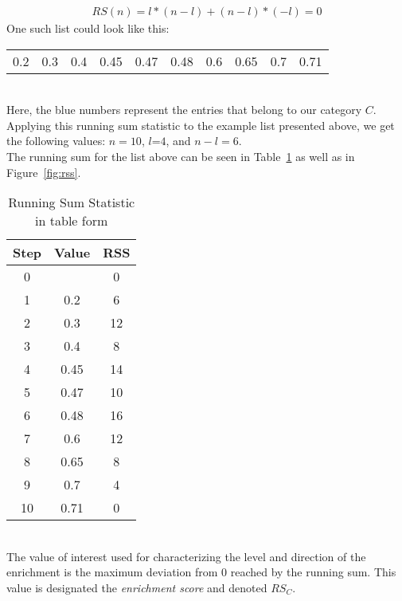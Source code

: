 \begin{align}
	RS(n) = l*(n-l)+(n-l)*(-l) = 0
\end{align}
One such list could look like this:\\
\begin{tabular}{m{1.5em} m{1.5em} m{1.5em} m{1.5em} m{1.5em} m{1.5em} m{1.5em} m{1.5em} m{1.5em} m{1.5em}}
	\color{Cerulean}0.2&
	\color{Cerulean}0.3&
	\color{Black}0.4&
	\color{Cerulean}0.45&
	\color{Black}0.47&
	\color{Cerulean}0.48&
	\color{Black}0.6&
	\color{Black}0.65&
	\color{Black}0.7&
	\color{black}0.71
\end{tabular}\\
Here, the blue numbers represent the entries that belong to our category $C$.\\
Applying this running sum statistic to the example list presented above, we get the following values: $n=10$, $l$=$4$, and $n-l=6$.\\
The running sum for the list above can be seen in Table~\ref{table:rss} as well as in Figure~\ref{fig:rss}.\\
\begin{table}
	\centering
	\begin{tabular}{|c|c|c|}
		\hline
		Step&Value&RSS\\
		\hline
		0&&0\\
		\hline
		1&\color{Cerulean}0.2\color{Black}&6\\
		\hline
		2&\color{Cerulean}0.3\color{Black}&12\\
		\hline
		3&0.4&8\\
		\hline
		4&\color{Cerulean}0.45\color{Black}&14\\
		\hline
		5&0.47&10\\
		\hline
		6&\color{Cerulean}0.48\color{Black}&\color{WildStrawberry}16\color{Black}\\
		\hline
		7&0.6&12\\
		\hline
		8&0.65&8\\
		\hline
		9&0.7&4\\
		\hline
		10&0.71&0\\
		\hline
	\end{tabular}
	\caption{Running Sum Statistic in table form}
	\label{table:rss}
\end{table}\\
The value of interest used for characterizing the level and direction of the enrichment is the maximum deviation from $0$ reached by the running sum. This value is designated the \emph{enrichment score} and denoted $RS_{C}$.\\
